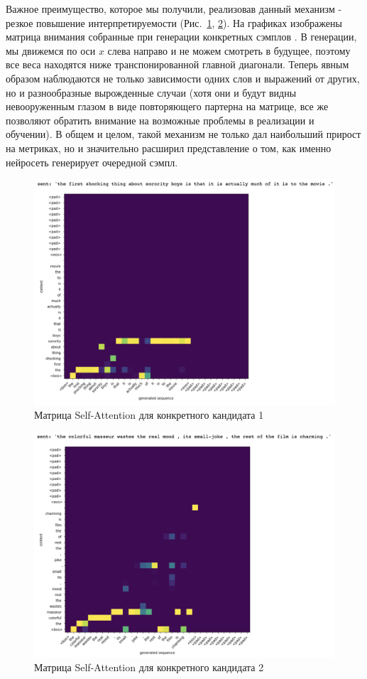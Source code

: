 \documentclass{spbau-diploma}
\begin{document}
Важное преимущество, которое мы получили, реализовав данный механизм - резкое
повышение интерпретируемости (Рис.~\ref{sa_sample1}, \ref{sa_sample2}). На 
графиках изображены матрица внимания собранные при генерации конкретных сэмплов
. В генерации, мы движемся по оси $x$ слева направо и не можем смотреть в 
будущее, поэтому все веса находятся ниже транспонированной главной диагонали. 
Теперь явным образом наблюдаются не только зависимости одних слов и выражений 
от других, но и разнообразные вырожденные случаи (хотя они и будут видны 
невооруженным глазом в виде повторяющего партерна на матрице, все же позволяют 
обратить внимание на возможные проблемы в реализации и обучении). В общем и 
целом, такой механизм не только дал наибольший прирост на метриках, но и 
значительно расширил представление о том, как именно нейросеть генерирует
очередной сэмпл.

\begin{figure}[H]
\centering
\includegraphics[width=\textwidth]{images/sa_sample1.png}
\caption{Матрица Self-Attention для конкретного кандидата 1}
\label{sa_sample1}
\end{figure}

\begin{figure}[H]
\centering
\includegraphics[width=\textwidth]{images/sa_sample2.png}
\caption{Матрица Self-Attention для конкретного кандидата 2}
\label{sa_sample2}
\end{figure}
\end{document}
